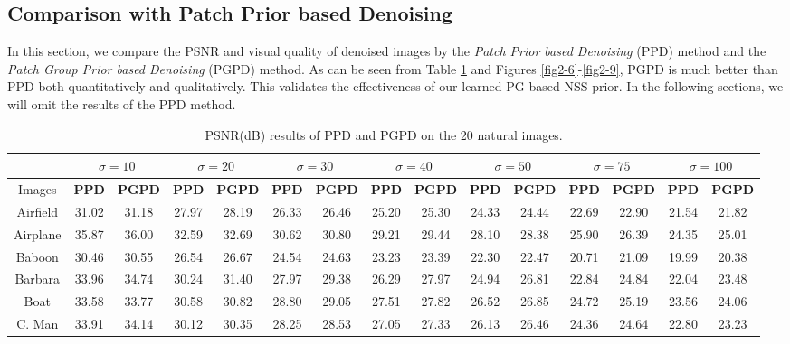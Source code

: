 \subsection{Comparison with Patch Prior based Denoising}
In this section, we compare the PSNR and visual quality of denoised images by the \textsl{Patch Prior based Denoising} (PPD) method and the \textsl{Patch Group Prior based Denoising} (PGPD) method. As can be seen from Table \ref{tab2-1} and Figures \ref{fig2-6}-\ref{fig2-9}, PGPD is much better than PPD both quantitatively and qualitatively. This validates the effectiveness of our learned PG based NSS prior. In the following sections, we will omit the results of the PPD method.
\begin{table}
\begin{adjustwidth}{-3cm}{}
\scriptsize
\caption{PSNR(dB) results of PPD and PGPD on the 20 natural images.}
\label{tab2-1}
\centering
\begin{tabular}{|c||c|c||c|c||c|c||c|c||c|c||c|c||c|c|}
\hline
&\multicolumn{2}{c||}{ $\sigma = 10$}&\multicolumn{2}{c||}{ $\sigma = 20$}&\multicolumn{2}{c||}{ $\sigma = 30$}
&\multicolumn{2}{c||}{ $\sigma = 40$}&\multicolumn{2}{c||}{ $\sigma = 50$}&\multicolumn{2}{c||}{ $\sigma = 75$}
&\multicolumn{2}{c|}{ $\sigma = 100$}
\\
\hline
\hline
Images&\textbf{PPD}&\textbf{PGPD}&\textbf{PPD}&\textbf{PGPD}&\textbf{PPD}&\textbf{PGPD}&\textbf{PPD}&\textbf{PGPD}&\textbf{PPD}
&\textbf{PGPD}&\textbf{PPD}&\textbf{PGPD}&\textbf{PPD}&\textbf{PGPD}
\\
\hline
Airfield&31.02 &31.18  &27.97&28.19  &26.33& 26.46   &25.20 & 25.30  & 24.33 & 24.44  &22.69 &22.90   &21.54&21.82 
\\
\hline
Airplane&35.87 &36.00     &32.59&32.69   &30.62&30.80 &29.21&29.44  &28.10& 28.38    &25.90& 26.39  &24.35 &25.01
\\
\hline
Baboon&30.46&30.55   &26.54&26.67  &24.54 & 24.63 & 23.23&23.39  & 22.30&22.47    &20.71 & 21.09   &19.99 &20.38
\\
\hline 
Barbara&33.96&34.74    &30.24&31.40 & 27.97 & 29.38 & 26.29 & 27.97  &24.94 & 26.81  &22.84 &24.84   &22.04&23.48
\\
\hline
Boat&33.58&33.77     &30.58&30.82    & 28.80 &  29.05  &27.51 & 27.82   & 26.52 &  26.85   & 24.72 &25.19  & 23.56&24.06       
\\
\hline
C. Man&33.91&34.14     &30.12&30.35  & 28.25& 28.53  & 27.05& 27.33  & 26.13 & 26.46  &24.36 &24.64    &22.80 &23.23 
\\
\hline

\end{tabular}
\end{adjustwidth}
\end{table}
